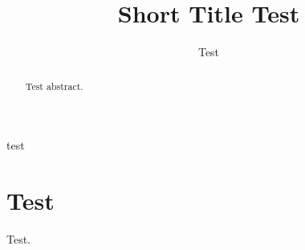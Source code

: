 ﻿\documentclass[a4paper,fleqn]{cas-sc}
\begin{document}
\let\WriteBookmarks\relax
\def\floatpagepagefraction{1}
\def\textpagefraction{.001}


\title[mode=title]{Short Title Test}

\author[1]{Test}

\begin{abstract}
Test abstract.
\end{abstract}

\begin{keywords}
test
\end{keywords}

\maketitle

\section{Test}
Test.
\end{document}
